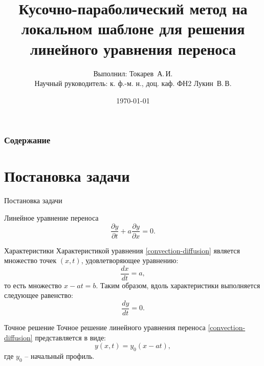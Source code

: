 \documentclass[unicode, 8pt]{beamer}
\title[Курсовая работа]{Кусочно-параболический метод на локальном шаблоне для решения линейного уравнения переноса}
\author[Токарев А.\,И.]{Выполнил: Токарев~А.\,И.\\[1ex]  {Научный руководитель: к. ф.-м. н., доц. каф. ФН2 Лукин~В.\,В.}}
\institute[]{МГТУ им. Н.Э. Баумана}
\date{\today}
\begin{document}
    \begin{frame}
        \titlepage
    \end{frame}

    \begin{frame}
        \frametitle{Содержание}
        \tableofcontents
    \end{frame}

    \section{Постановка задачи}

    \begin{frame}{Постановка задачи}
        \begin{block}{Линейное уравнение переноса}
         \begin{equation}
             \label{convection-diffusion}
             \dfrac{\partial y}{\partial t} + a \dfrac{\partial y}{\partial x} = 0.
         \end{equation}
        \end{block}

        \begin{block}{Характеристики}
            Характеристикой уравнения \eqref{convection-diffusion} является множество точек $(x,t)$, удовлетворяющее уравнению:
            \begin{equation}
                \label{characteristics}
                \dfrac{dx}{dt} = a,    
            \end{equation}
            \noindent то есть множество $x-at = b$. Таким образом, вдоль характеристики выполняется следующее равенство:
            \[
                \dfrac{dy}{dt} = 0.  
            \]
        \end{block}
        \begin{block}{Точное решение}
            Точное решение линейного уравнения переноса \eqref{convection-diffusion} представляется в виде:
            \[ y(x, t) = y_0(x-at), \]
            \noindent где $ y_0 $ -- начальный профиль.
        \end{block}
    \end{frame}
\end{document}
